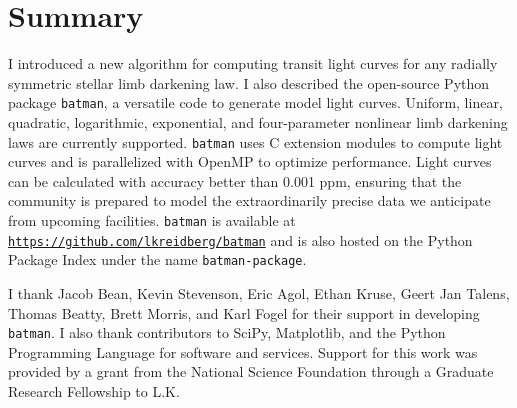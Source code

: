 \documentclass[12pt,preprint]{aastex}
\newcommand*{\blue}{\textcolor{blue}}
\begin{document}
\section{Summary}
\label{section:summary}
I introduced a new algorithm for computing transit light curves for any radially symmetric stellar limb darkening law.  I also described the open-source Python package \texttt{batman}, a versatile code to generate model light curves. Uniform, linear, quadratic, logarithmic, exponential, and four-parameter nonlinear limb darkening laws are currently supported.  \texttt{batman} uses C extension modules to compute light curves and is parallelized with OpenMP to optimize performance.  Light curves can be calculated with accuracy better than 0.001 ppm, ensuring that the community is prepared to model the extraordinarily precise data we anticipate from upcoming facilities. \texttt{batman} is available at \texttt{\blue{\url{https://github.com/lkreidberg/batman}}} and is also hosted on the Python Package Index under the name \texttt{batman-package}.

\acknowledgments
I thank Jacob Bean, Kevin Stevenson, Eric Agol, Ethan Kruse, Geert Jan Talens, Thomas Beatty, Brett Morris, and Karl Fogel for their support in developing \texttt{batman}. I also thank contributors to SciPy, Matplotlib, and the Python Programming Language for software and services.  Support for this work was provided by a grant from the National Science Foundation through a Graduate Research Fellowship to L.K.  



\end{document}
